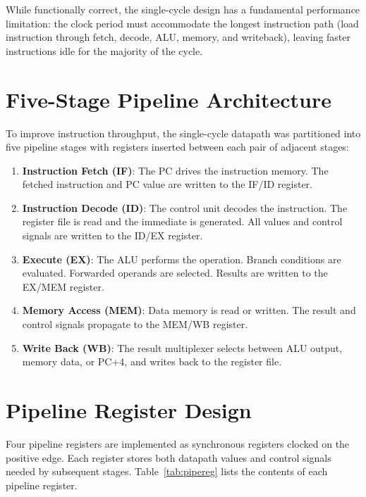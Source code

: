 \documentclass[12pt,a4paper]{report}
\begin{document}
While functionally correct, the single-cycle design has a fundamental performance
limitation: the clock period must accommodate the longest instruction path (load
instruction through fetch, decode, ALU, memory, and writeback), leaving faster
instructions idle for the majority of the cycle.

\section{Five-Stage Pipeline Architecture}
To improve instruction throughput, the single-cycle datapath was partitioned into five
pipeline stages with registers inserted between each pair of adjacent stages:

\begin{enumerate}
    \item \textbf{Instruction Fetch (IF)}: The PC drives the instruction memory. The
          fetched instruction and PC value are written to the IF/ID register.
    \item \textbf{Instruction Decode (ID)}: The control unit decodes the instruction.
          The register file is read and the immediate is generated. All values and
          control signals are written to the ID/EX register.
    \item \textbf{Execute (EX)}: The ALU performs the operation. Branch conditions are
          evaluated. Forwarded operands are selected. Results are written to the
          EX/MEM register.
    \item \textbf{Memory Access (MEM)}: Data memory is read or written. The result
          and control signals propagate to the MEM/WB register.
    \item \textbf{Write Back (WB)}: The result multiplexer selects between ALU
          output, memory data, or PC+4, and writes back to the register file.
\end{enumerate}

\section{Pipeline Register Design}
Four pipeline registers are implemented as synchronous registers clocked on the
positive edge. Each register stores both datapath values and control signals needed
by subsequent stages. Table~\ref{tab:pipereg} lists the contents of each pipeline
register.
\end{document}
